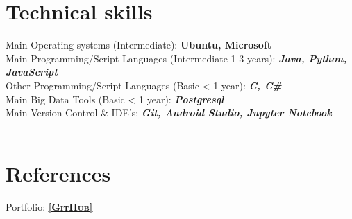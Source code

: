 \documentclass[11pt,a4paper,sans,colorlinks,linkcolor=blue,urlcolor=blue]{moderncv}
\begin{document}
\section{Technical skills}
Main Operating systems (Intermediate): \textbf{Ubuntu, Microsoft}
\\
{Main Programming/Script Languages (Intermediate 1-3 years): \textbf{\textit{Java, Python, JavaScript}}}
\\
{Other Programming/Script Languages (Basic < 1 year): \textbf{\textit{C, C\#}}}
\\
Main Big Data Tools (Basic < 1 year): 
\textbf{\textit{Postgresql}}
\\
Main Version Control \& IDE's: \textbf{\textit{Git, Android Studio, Jupyter Notebook}}
\\
\\

\section{References}
Portfolio: \underline{\href{https://github.com/jacobpihl}{\textbf{\textsc{[GitHub]}}}}\\

\end{document}
